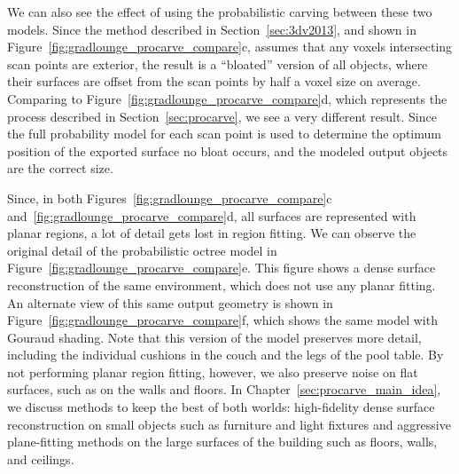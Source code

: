 \documentclass[12pt,onecolumn,oneside]{book}
\begin{document}
We can also see the effect of using the probabilistic carving between these two models.  Since the method described in Section~\ref{sec:3dv2013}, and shown in Figure~\ref{fig:gradlounge_procarve_compare}c, assumes that any voxels intersecting scan points are exterior, the result is a ``bloated'' version of all objects, where their surfaces are offset from the scan points by half a voxel size on average.  Comparing to Figure~\ref{fig:gradlounge_procarve_compare}d, which represents the process described in Section~\ref{sec:procarve}, we see a very different result.  Since the full probability model for each scan point is used to determine the optimum position of the exported surface no bloat occurs, and the modeled output objects are the correct size.

Since, in both Figures~\ref{fig:gradlounge_procarve_compare}c and~\ref{fig:gradlounge_procarve_compare}d, all surfaces are represented with planar regions, a lot of detail gets lost in region fitting.  We can observe the original detail of the probabilistic octree model in Figure~\ref{fig:gradlounge_procarve_compare}e.  This figure shows a dense surface reconstruction of the same environment, which does not use any planar fitting.  An alternate view of this same output geometry is shown in Figure~\ref{fig:gradlounge_procarve_compare}f, which shows the same model with Gouraud shading.  Note that this version of the model preserves more detail, including the individual cushions in the couch and the legs of the pool table.  By not performing planar region fitting, however, we also preserve noise on flat surfaces, such as on the walls and floors.  In Chapter~\ref{sec:procarve_main_idea}, we discuss methods to keep the best of both worlds:  high-fidelity dense surface reconstruction on small objects such as furniture and light fixtures and aggressive plane-fitting methods on the large surfaces of the building such as floors, walls, and ceilings.
\end{document}
